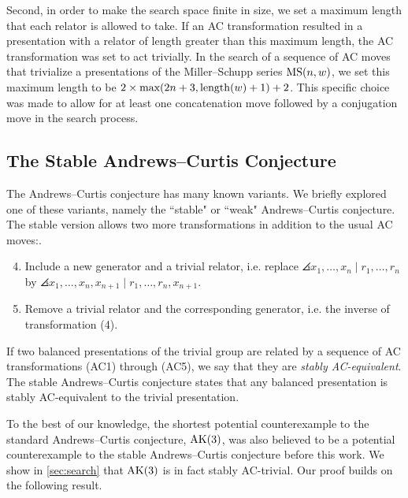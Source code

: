 Second, in order to make the search space finite in size, we set a maximum length that each relator is allowed to take.
If an AC transformation resulted in a presentation with a relator of length greater than this maximum length, the AC transformation was set to act trivially.
In the search of a sequence of AC moves that trivialize a presentations of the Miller--Schupp series $\text{MS}(n, w)$, we set this maximum length to be $2 \times \text{max}(2 n+3, \operatorname{length}(w)+1) + 2$.
This specific choice was made to allow for at least one concatenation move followed by a conjugation move in the search process.

\subsection*{The Stable Andrews--Curtis Conjecture}\label{sec:stable_ac}

The Andrews--Curtis conjecture has many known variants.
 We briefly explored one of these variants, namely the ``stable" or ``weak" Andrews--Curtis conjecture.
The stable version allows two more transformations in addition to the usual AC moves:.

\begin{enumerate}[label=(AC\arabic*)]
	\setcounter{enumi}{3}
	\item Include a new generator and a trivial relator, i.e. replace $\angles{x_1, \dots, x_n \mid r_1, \dots, r_n}$ by $\angles{x_1, \dots, x_n, x_{n+1} \mid r_1, \dots, r_n, x_{n+1}}$.
	\item Remove a trivial relator and the corresponding generator, i.e. the inverse of transformation (4).
\end{enumerate}
If two balanced presentations of the trivial group are related by a sequence of AC transformations (AC1) through (AC5), we say that they are \textit{stably AC-equivalent}.
The stable Andrews--Curtis conjecture states that any balanced presentation is stably AC-equivalent to the trivial presentation.
\newline

To the best of our knowledge, the shortest potential counterexample to the standard Andrews--Curtis conjecture, $\text{AK}(3)$, was also believed to be a potential counterexample to the stable Andrews--Curtis conjecture before this work.
We show in \autoref{sec:search} that $\text{AK}(3)$ is in fact stably AC-trivial.
Our proof builds on the following result.

